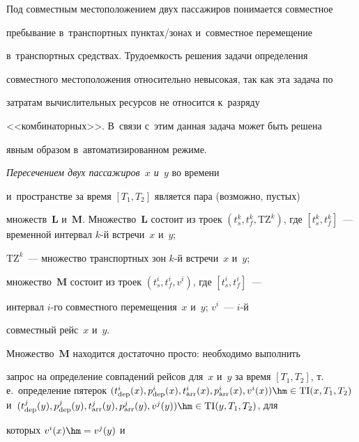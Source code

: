 Под совместным местоположением двух пассажиров понимается со\-вмест\-ное 


пребывание в~транспортных пунк\-тах\!/\!зо\-нах и~совместное перемещение 


в~транспортных средствах. Трудоемкость решения задачи определения 


со\-вмест\-но\-го местоположения относительно невысокая, так как эта задача по 


затратам вы\-чис\-ли\-тель\-ных ресурсов не относится к~разряду 


<<комбинаторных>>. В~связи с~этим данная задача может быть решена 


явным образом в~автоматизированном режиме.





\textit{Пересечением двух пассажиров~$x$ и~$y$} во времени 


и~пространстве за время $[T_1, T_2]$ является пара (возможно, пустых) 


множеств~$\bm{L}$ и~$\bm{M}$. Множество~$\bm{L}$ со\-сто\-ит из троек $(t^k_s, t^k_f, 


\mathrm{TZ}^k)$, где $[t^k_s, t^k_f]$~--- временной интервал $k$-й встречи~$x$ и~$y$; 


$\mathrm{TZ}^k$~--- множество транспортных зон $k$-й встречи~$x$ и~$y$; 


множество~$\bm{M}$ со\-сто\-ит из троек $(t^i_s, t^i_f, v^i)$, где $[t^i_s, t^i_f]$~--- 


интервал $i$-го со\-вмест\-но\-го перемещения~$x$ и~$y$; $v^i$~--- $i$-й 


совместный рейс~$x$ и~$y$.





Множество~$\bm{M}$ находится достаточно прос\-то: необходимо выполнить 


запрос на определение совпадений рейсов для~$x$ и~$y$ за время $[T_1, 


T_2]$, т.\,е.\ определение пятерок $(t^i_{\mathrm{dep}}(x), 


p^i_{\mathrm{dep}}(x), t^i_{\mathrm{arr}}(x), p^i_{\mathrm{arr}}(x), v^i(x)) 


\hm\in \mathrm{TI}(x, T_1, T_2)$ и~$(t^j_{\mathrm{dep}}(y), p^j_{\mathrm{dep}}(y), 


t^j_{\mathrm{arr}}(y), p^j_{\mathrm{arr}}(y), v^j(y)) \hm\in \mathrm{TI}(y, T_1, T_2)$, для 


которых $v^i(x) \hm= v^j(y)$ и 


